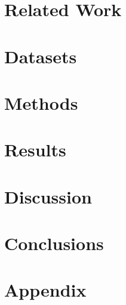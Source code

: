 \documentclass[a4paper, 11pt]{memoir}
\begin{document}
\chapter{Related Work} \label{cha:2_related_work}

\cleardoublepage

\chapter{Datasets} \label{cha:3_datasets}

\cleardoublepage

\chapter{Methods} \label{cha:4_methods}

\cleardoublepage

\chapter{Results} \label{cha:5_results}

\cleardoublepage

\chapter{Discussion} \label{cha:6_discussion}

\cleardoublepage

\chapter{Conclusions} \label{cha:7_conclusions}

\cleardoublepage


\backmatter
\appendix

\chapter{Appendix} \label{cha:appendix}




\end{document}
